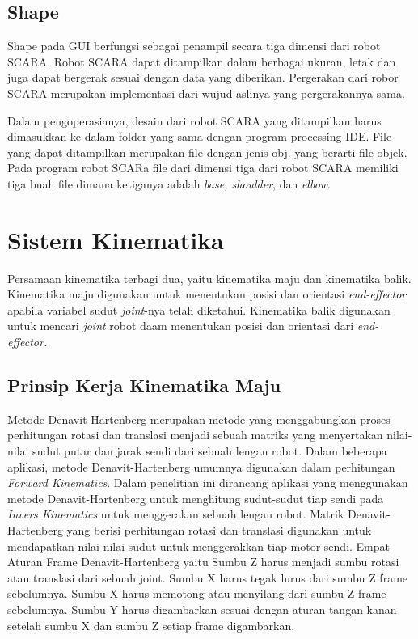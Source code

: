 \subsection{Shape}
Shape pada GUI berfungsi sebagai penampil secara tiga dimensi dari robot SCARA. Robot SCARA dapat ditampilkan dalam berbagai ukuran, letak dan juga dapat bergerak sesuai dengan data yang diberikan. Pergerakan dari robor SCARA merupakan implementasi dari wujud aslinya yang pergerakannya sama.

Dalam pengoperasianya, desain dari robot SCARA yang ditampilkan harus dimasukkan ke dalam folder yang sama dengan program processing IDE. File yang dapat ditampilkan merupakan file dengan jenis obj. yang berarti file objek. Pada program robot SCARa file dari dimensi tiga dari robot SCARA memiliki tiga buah file dimana ketiganya adalah \textit{base, shoulder}, dan \textit{elbow}. 

\section{Sistem Kinematika}
Persamaan kinematika terbagi dua, yaitu kinematika maju dan kinematika balik. Kinematika maju digunakan untuk menentukan posisi dan orientasi \textit{end-effector} apabila variabel sudut \textit{joint}-nya telah diketahui. Kinematika balik digunakan untuk mencari \textit{joint} robot daam menentukan posisi dan orientasi dari \textit{end-effector.}
\subsection{Prinsip Kerja Kinematika Maju}
Metode Denavit-Hartenberg merupakan metode yang menggabungkan proses perhitungan rotasi dan translasi menjadi sebuah matriks yang menyertakan nilai-nilai sudut putar dan jarak sendi dari sebuah lengan robot. Dalam beberapa aplikasi, metode Denavit-Hartenberg umumnya digunakan dalam perhitungan \textit{Forward Kinematics}. Dalam penelitian ini dirancang aplikasi yang menggunakan metode Denavit-Hartenberg untuk menghitung sudut-sudut tiap sendi pada \textit{Invers Kinematics} untuk menggerakan sebuah lengan robot. Matrik Denavit-Hartenberg yang berisi perhitungan rotasi dan translasi digunakan untuk mendapatkan nilai nilai sudut untuk menggerakkan tiap motor sendi. Empat Aturan Frame Denavit-Hartenberg yaitu Sumbu Z harus menjadi sumbu rotasi atau translasi dari sebuah joint. Sumbu X harus tegak lurus dari sumbu Z frame sebelumnya. Sumbu X harus memotong atau menyilang dari sumbu Z frame sebelumnya. Sumbu Y harus digambarkan sesuai dengan aturan tangan kanan setelah sumbu X   dan sumbu Z setiap frame digambarkan.
